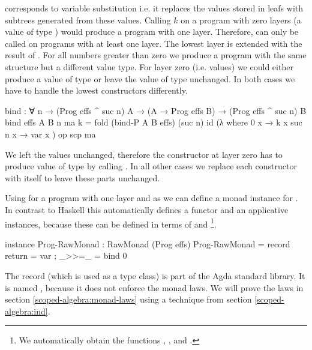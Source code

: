 \bind{} corresponds to variable substitution i.e. it replaces the values stored
in  leafs with subtrees generated from these
values.
Calling $k$ on a program with zero layers (a value of type )
would produce a program with one layer.
Therefore, \bind{} can only be called on programs with at least one layer.
The lowest layer is extended with the result of .
For all numbers greater than zero we produce a program with the same structure
but a different value type.
For layer zero (i.e. values) we could either produce a value of type 
\AgdaSpace{}\AgdaSpace{}
or leave the value of type  unchanged.
In both cases we have to handle the lowest 
constructors differently.

\begin{code}
bind : ∀ n → (Prog effs ^ suc n) A → (A → Prog effs B) →
  (Prog effs ^ suc n) B
bind {effs} {A} {B} n ma k = fold (bind-P A B effs) (suc n) id (λ where
    {0}      x → k x
    {suc n}  x → var x
  ) op scp ma
\end{code}
We left the values unchanged, therefore the 
constructor at layer zero has to produce value of type
\AgdaSpace{}\AgdaSpace{}
by calling .
In all other cases we replace each constructor with itself to leave these parts
unchanged.

Using \bind{} for a program with one layer and  as
 we can define a monad instance for
\AgdaSpace{}.
In contrast to Haskell this automatically defines a functor and an applicative
instances, because these can be defined in terms of \bind{} and
\footnote{We automatically obtain the functions
  \AgdaFunction{<\$>}, \AgdaFunction{<*>},  and
  \AgdaFunction{>>}. }.
\begin{code}
instance
  Prog-RawMonad : RawMonad (Prog effs)
  Prog-RawMonad = record { return = var ; _>>=_ = bind 0 }
\end{code}
The record (which is used as a type class) is part of the Agda standard library.
It is named , because it does not enforce the monad laws.
We will prove the laws in section \ref{scoped-algebra:monad-laws} using
a technique from section \ref{scoped-algebra:ind}.



